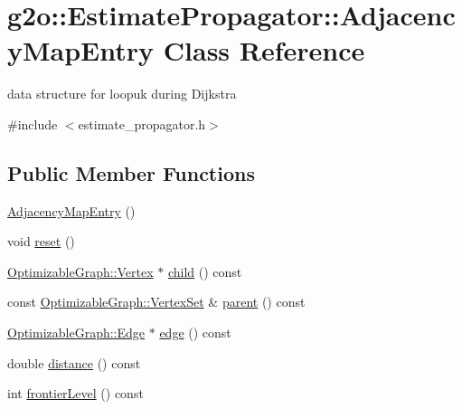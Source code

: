 \hypertarget{classg2o_1_1_estimate_propagator_1_1_adjacency_map_entry}{}\section{g2o\+:\+:Estimate\+Propagator\+:\+:Adjacency\+Map\+Entry Class Reference}
\label{classg2o_1_1_estimate_propagator_1_1_adjacency_map_entry}


data structure for loopuk during Dijkstra  




{\ttfamily \#include $<$estimate\+\_\+propagator.\+h$>$}

\subsection*{Public Member Functions}
\begin{DoxyCompactItemize}
\item 
\mbox{\hyperlink{classg2o_1_1_estimate_propagator_1_1_adjacency_map_entry_a5fe6ab271c62be13c363ea3807e6d357}{Adjacency\+Map\+Entry}} ()
\item 
void \mbox{\hyperlink{classg2o_1_1_estimate_propagator_1_1_adjacency_map_entry_a6d2f95439aa6ee608f2e2d110de553e8}{reset}} ()
\item 
\mbox{\hyperlink{classg2o_1_1_optimizable_graph_1_1_vertex}{Optimizable\+Graph\+::\+Vertex}} $\ast$ \mbox{\hyperlink{classg2o_1_1_estimate_propagator_1_1_adjacency_map_entry_a4e31105d4e88c399ec95aa6c184b649e}{child}} () const
\item 
const \mbox{\hyperlink{classg2o_1_1_hyper_graph_a703938cdb4bb636860eed55a2489d70c}{Optimizable\+Graph\+::\+Vertex\+Set}} \& \mbox{\hyperlink{classg2o_1_1_estimate_propagator_1_1_adjacency_map_entry_afdc412171a1828e9d588f587ba27f7aa}{parent}} () const
\item 
\mbox{\hyperlink{classg2o_1_1_optimizable_graph_1_1_edge}{Optimizable\+Graph\+::\+Edge}} $\ast$ \mbox{\hyperlink{classg2o_1_1_estimate_propagator_1_1_adjacency_map_entry_a7082664efdadcd6031ab441830cb7ac4}{edge}} () const
\item 
double \mbox{\hyperlink{classg2o_1_1_estimate_propagator_1_1_adjacency_map_entry_a6a7bbf0ae959ece486cea3549dec5c0a}{distance}} () const
\item 
int \mbox{\hyperlink{classg2o_1_1_estimate_propagator_1_1_adjacency_map_entry_a291b75bdb7c37467a6d4e7e7d839e0fc}{frontier\+Level}} () const
\end{DoxyCompactItemize}
